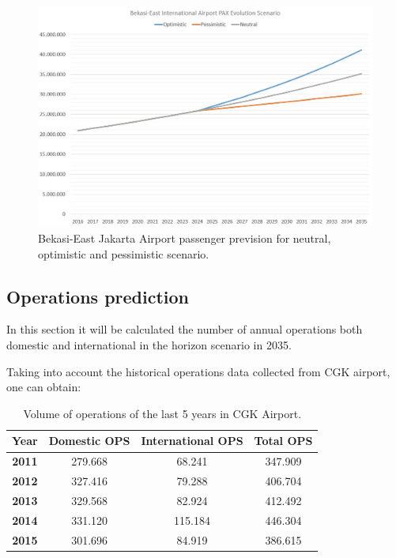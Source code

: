 \begin{figure}[H]
	\centering
	\includegraphics[clip, trim=0cm 0cm 0cm 0cm, width=1\textwidth]{./images/PROGNOSIS/TrafficForecast/BE_PAX_Prev_NEUOPTPES}
	\caption{Bekasi-East Jakarta Airport passenger prevision for neutral, optimistic and pessimistic scenario.}
	\label{BE_PAX_Prev_NEUOPTPES}
\end{figure}

	\subsection{Operations prediction}
In this section it will be calculated the number of annual operations both domestic and international in the horizon scenario in 2035.
	
Taking into account the historical operations data collected from CGK airport, one can obtain:

\begin{table}[H]
	\label{table:OPSCGK}
	\centering
\begin{tabular}{|c|c|c|c|}
	\hline 
	\textbf{Year} & \textbf{Domestic OPS} & \textbf{International OPS} & \textbf{Total OPS}\tabularnewline
	\hline  
	\textbf{2011} & 279.668  & 68.241  & 347.909 \tabularnewline
	\hline 
	\textbf{2012} & 327.416  & 79.288  & 406.704 \tabularnewline
	\hline 
	\textbf{2013} & 329.568  & 82.924  & 412.492 \tabularnewline
	\hline 
	\textbf{2014} & 331.120  & 115.184  & 446.304 \tabularnewline
	\hline 
	\textbf{2015} & 301.696  & 84.919  & 386.615 \tabularnewline
	\hline 
\end{tabular}
	\caption{Volume of operations of the last 5 years in CGK Airport.}
\end{table}
	
